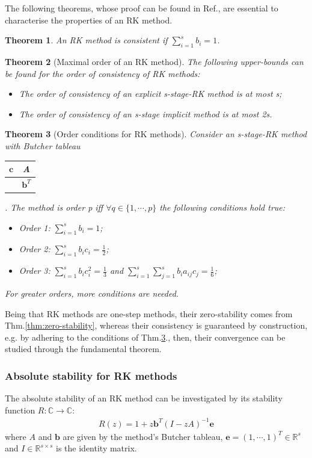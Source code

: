 \documentclass[11pt]{article}
\theoremstyle{theorem}
\newtheorem{theorem}{Theorem}
\theoremstyle{definition}
\begin{document}
The following theorems, whose proof can be found in Ref.\cite{lec-notes}, are essential to characterise the properties of an RK method.\\

\begin{theorem}
	\label{thm:consistency-RK}
	An RK method is consistent if $\sum_{i=1}^{s}b_i=1$.
\end{theorem}

\begin{theorem}[Maximal order of an RK method]
	\label{thm:order-RK}
	The following upper-bounds can be found for the order of consistency of RK methods:
	\begin{itemize}
		\item The order of consistency of an explicit s-stage-RK method is at most s;
		\item The order of consistency of an s-stage implicit method is at most 2s.
	\end{itemize}
\end{theorem}

\begin{theorem}[Order conditions for RK methods]
	\label{thm:order-cond-RK}
	Consider an s-stage-RK method with Butcher tableau 
	\begin{tabular}{c|c}
		$\mathbf{c}$ & A  \\
		\hline
		& $\mathbf{b}^T$ \\
	\end{tabular}
	. The method is order p iff $\forall q\in\lbrace 1,\cdots, p\rbrace$ the following conditions hold true:
	\begin{itemize}
		\item Order 1: $\sum_{i=1}^{s}b_i=1$;
		\item Order 2: $\sum_{i=1}^{s}b_ic_i=\frac{1}{2}$;
		\item Order 3: $\sum_{i=1}^{s}b_ic_i^2=\frac{1}{3}$ and $\sum_{i=1}^{s}\sum_{j=1}^{s}b_ia_{ij}c_j=\frac{1}{6}$;
	\end{itemize}
	For greater orders, more conditions are needed.\\
\end{theorem}

Being that RK methods are one-step methods, their zero-stability comes from Thm.\ref{thm:zero-stability}, whereas their consistency is guaranteed by construction,
e.g. by adhering to the conditions of Thm.\ref{thm:order-cond-RK}., then, their convergence can be studied through the fundamental theorem.\\
\subsubsection{Absolute stability for RK methods}
The absolute stability of an RK method can be investigated by its stability function
$R:\mathbb{C}\rightarrow\mathbb{C}$:
\begin{align}
	\label{eqn:R}
	R(z)= 1+z\mathbf{b}^T(I-zA)^{-1}\mathbf{e}
\end{align}
where $A$ and $\mathbf{b}$ are given by the method's Butcher tableau, $\mathbf{e}=(1,\cdots, 1)^T\in\mathbb{R}^s$ and $I\in\mathbb{R}^{s\times s}$ is the identity matrix.
\end{document}
